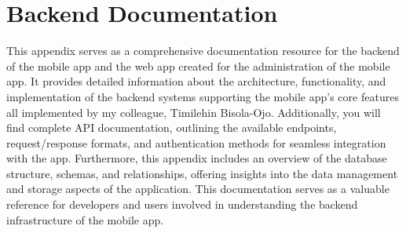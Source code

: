 \chapter{Backend Documentation}
\label{appx:backend_doc}
\begin{appendix}
This appendix serves as a comprehensive documentation resource for the backend of the mobile app and the web app created for the administration of the mobile app. It provides detailed information about the architecture, functionality, and implementation of the backend systems supporting the mobile app's core features all implemented by my colleague, Timilehin Bisola-Ojo. Additionally, you will find complete API documentation, outlining the available endpoints, request/response formats, and authentication methods for seamless integration with the app. Furthermore, this appendix includes an overview of the database structure, schemas, and relationships, offering insights into the data management and storage aspects of the application. This documentation serves as a valuable reference for developers and users involved in understanding the backend infrastructure of the mobile app.
    
\end{appendix}